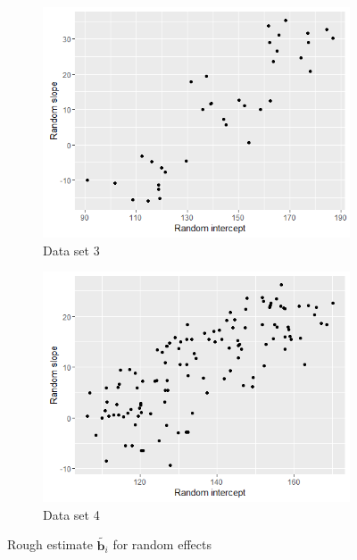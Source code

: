 \begin{figure}[!htb]
\centering
	\begin{subfigure}[b]{0.4\textwidth}
		\includegraphics[width=\textwidth]{mainmatter/chapter_5_simulation_study/ds_3wellsep3ppg_randplot.png}
       \caption{\label{fig : ds_3wellsep3ppg_randplot}Data set 3}
	\end{subfigure}    
    \begin{subfigure}[b]{0.4\textwidth}
		\includegraphics[width=\textwidth]{mainmatter/chapter_5_simulation_study/ds_3fused10ppg_randplot.png}
        \caption{\label{fig : ds_3fused10ppg_randplot}Data set 4}
	\end{subfigure}
\caption{\label{fig : ds_3comp_3ppgwelsep_10ppgfused}Rough estimate $\tilde{\boldsymbol{b}_i}$ for random effects}
\end{figure}

